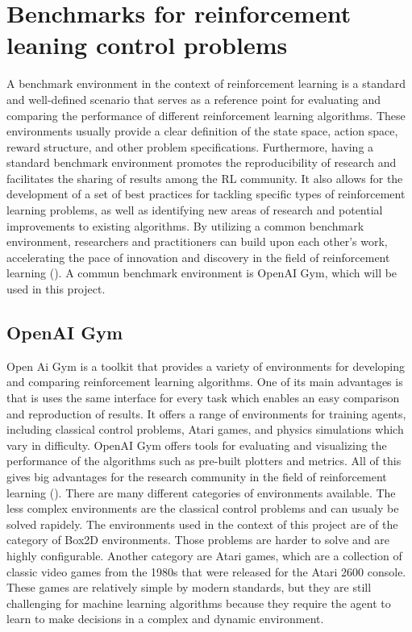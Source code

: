 \section{Benchmarks for reinforcement leaning control problems}

A benchmark environment in the context of reinforcement learning is a standard and well-defined scenario that serves as a reference point for evaluating and comparing the performance of different reinforcement learning algorithms. These environments usually provide a clear definition of the state space, action space, reward structure, and other problem specifications.
Furthermore, having a standard benchmark environment promotes the reproducibility of research and facilitates the sharing of results among the RL community. It also allows for the development of a set of best practices for tackling specific types of reinforcement learning problems, as well as identifying new areas of research and potential improvements to existing algorithms. By utilizing a common benchmark environment, researchers and practitioners can build upon each other's work, accelerating the pace of innovation and discovery in the field of reinforcement learning (\cite{sutton_reinforcement_2018}). A commun benchmark environment is OpenAI Gym, which will be used in this project.

\subsection{OpenAI Gym}

Open Ai Gym is a toolkit that provides a variety of environments for developing and comparing reinforcement learning algorithms. One of its main advantages is that is uses the same interface for every task which enables an easy comparison and reproduction of results. It offers a range of environments for training agents, including classical control problems, Atari games, and physics simulations which vary in difficulty. OpenAI Gym offers tools for evaluating and visualizing the performance of the algorithms such as pre-built plotters and metrics. All of this gives big advantages for the research community in the field of reinforcement learning (\cite{noauthor_openai_2016}). There are many different categories of environments available. The less complex environments are the classical control problems and can usualy be solved rapidely. The environments used in the context of this project are of the category of Box2D environments. Those problems are harder to solve and are highly configurable. Another category are Atari games, which are a collection of classic video games from the 1980s that were released for the Atari 2600 console. These games are relatively simple by modern standards, but they are still challenging for machine learning algorithms because they require the agent to learn to make decisions in a complex and dynamic environment.

